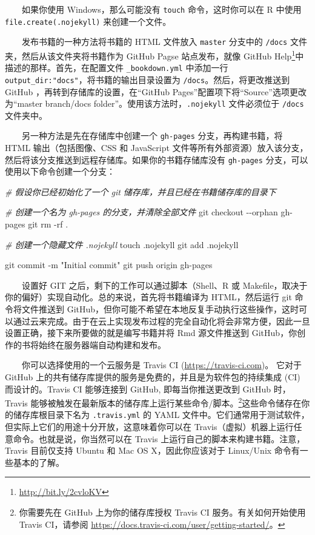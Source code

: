 \documentclass[
  12pt,
]{krantz}
\newenvironment{Shaded}{\begin{snugshade}}{\end{snugshade}}
\newcommand{\AttributeTok}[1]{\textcolor[rgb]{0.77,0.63,0.00}{#1}}
\newcommand{\CommentTok}[1]{\textcolor[rgb]{0.56,0.35,0.01}{\textit{#1}}}
\newcommand{\FunctionTok}[1]{\textcolor[rgb]{0.00,0.00,0.00}{#1}}
\newcommand{\NormalTok}[1]{#1}
\newcommand{\StringTok}[1]{\textcolor[rgb]{0.31,0.60,0.02}{#1}}
\renewcommand{\href}[2]{#2\footnote{\url{#1}}}
\theoremstyle{definition}
\theoremstyle{definition}
\theoremstyle{definition}
\theoremstyle{definition}
\theoremstyle{remark}
\begin{document}
  如果你使用 Windows，那么可能没有 \texttt{touch} 命令，这时你可以在 R 中使用 \texttt{file.create(\textquotesingle{}.nojekyll\textquotesingle{})} 来创建一个文件。

  发布书籍的一种方法将书籍的 HTML 文件放入 \texttt{master} 分支中的 \texttt{/docs} 文件夹，然后从该文件夹将书籍作为 GitHub Pagse 站点发布，就像 \href{http://bit.ly/2cvloKV}{GitHub Help}中描述的那样。首先，在配置文件 \texttt{\_bookdown.yml} 中添加一行 \texttt{output\_dir:"docs"}，将书籍的输出目录设置为 \texttt{/docs}。然后，将更改推送到 GitHub ，再转到存储库的设置，在``GitHub Pages''配置项下将``Source''选项更改为``master branch/docs folder''。使用该方法时，\texttt{.nojekyll} 文件必须位于 \texttt{/docs} 文件夹中。

  另一种方法是先在存储库中创建一个 \texttt{gh-pages} 分支，再构建书籍，将 HTML 输出（包括图像、CSS 和 JavaScript 文件等所有外部资源）放入该分支，然后将该分支推送到远程存储库。如果你的书籍存储库没有 \texttt{gh-pages} 分支，可以使用以下命令创建一个分支：

\begin{Shaded}
\begin{Highlighting}[]
\CommentTok{\# 假设你已经初始化了一个 git 储存库，并且已经在书籍储存库的目录下}

\CommentTok{\# 创建一个名为 gh{-}pages 的分支，并清除全部文件}
\FunctionTok{git}\NormalTok{ checkout }\AttributeTok{{-}{-}orphan}\NormalTok{ gh{-}pages}
\FunctionTok{git}\NormalTok{ rm }\AttributeTok{{-}rf}\NormalTok{ .}

\CommentTok{\# 创建一个隐藏文件 .nojekyll}
\FunctionTok{touch}\NormalTok{ .nojekyll}
\FunctionTok{git}\NormalTok{ add .nojekyll}

\FunctionTok{git}\NormalTok{ commit }\AttributeTok{{-}m} \StringTok{"Initial commit"}
\FunctionTok{git}\NormalTok{ push origin gh{-}pages}
\end{Highlighting}
\end{Shaded}

  设置好 GIT 之后，剩下的工作可以通过脚本（Shell、R 或 Makefile，取决于你的偏好）实现自动化。总的来说，首先将书籍编译为 HTML，然后运行 git 命令将文件推送到 GitHub，但你可能不希望在本地反复手动执行这些操作，这时可以通过云来完成。由于在云上实现发布过程的完全自动化将会非常方便，因此一旦设置正确，接下来所要做的就是编写书籍并将 Rmd 源文件推送到 GitHub，你创作的书将始终在服务器端自动构建和发布。

  你可以选择使用的一个云服务是 Travis CI (\url{https://travis-ci.com})。 它对于 GitHub 上的共有储存库提供的服务是免费的，并且是为软件包的持续集成 (CI) 而设计的。Travis CI 能够连接到 GitHub, 即每当你推送更改到 GitHub 时，Travis 能够被触发在最新版本的储存库上运行某些命令/脚本。\footnote{你需要先在 GitHub 上为你的储存库授权 Travis CI 服务。有关如何开始使用 Travis CI，请参阅 \url{https://docs.travis-ci.com/user/getting-started/}。}这些命令储存在你的储存库根目录下名为 \texttt{.travis.yml} 的 YAML 文件中。它们通常用于测试软件，但实际上它们的用途十分开放，这意味着你可以在 Travis（虚拟）机器上运行任意命令。也就是说，你当然可以在 Travis 上运行自己的脚本来构建书籍。注意，Travis 目前仅支持 Ubuntu 和 Mac OS X，因此你应该对于 Linux/Unix 命令有一些基本的了解。
\end{document}
